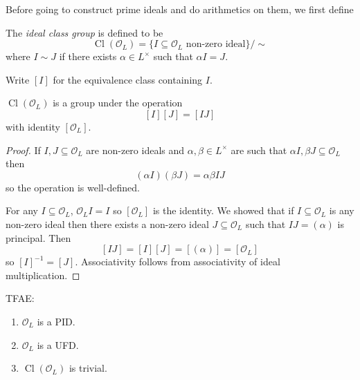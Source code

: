 \documentclass[a4paper]{article}
\renewcommand*{\O}{\mathcal{O}}
\DeclareMathOperator{\Cl}{Cl} %
\begin{document}
Before going to construct prime ideals and do arithmetics on them, we first define

\begin{definition}
  The \emph{ideal class group} is defined to be
  \[
    \Cl(\O_L) = \{I \subseteq \O_L \text{ non-zero ideal}\}/\sim
  \]
  where \(I \sim J\) if there exists \(\alpha \in L^\times\) such that \(\alpha I = J\).

  Write \([I]\) for the equivalence class containing \(I\).
\end{definition}

\begin{lemma}
  \(\Cl(\O_L)\) is a group under the operation
  \[
    [I][J] = [IJ]
  \]
  with identity \([\O_L]\).
\end{lemma}

\begin{proof}
  If \(I, J \subseteq \O_L\) are non-zero ideals and \(\alpha, \beta \in L^\times\) are such that \(\alpha I, \beta J \subseteq \O_L\) then
  \[
    (\alpha I)(\beta J) = \alpha\beta IJ
  \]
  so the operation is well-defined.

  For any \(I \subseteq \O_L\), \(\O_L I = I\) so \([\O_L]\) is the identity. We showed that if \(I \subseteq \O_L\) is any non-zero ideal then there exists a non-zero ideal \(J \subseteq \O_L\) such that \(IJ = (\alpha)\) is principal. Then
  \[
    [IJ] = [I][J] = [(\alpha)] = [\O_L]
  \]
  so \([I]^{-1} = [J]\). Associativity follows from associativity of ideal multiplication.
\end{proof}

\begin{proposition}
  TFAE:
  \begin{enumerate}
  \item \(\O_L\) is a PID.
  \item \(\O_L\) is a UFD.
  \item \(\Cl(\O_L)\) is trivial.
  \end{enumerate}
\end{proposition}
\end{document}
